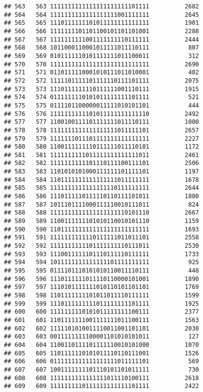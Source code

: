 \documentclass[]{article}
\begin{document}
\begin{verbatim}
## 563   563 1111111111111111111111101111          2682
## 564   564 1111111111111111111001111111          2645
## 565   565 1110111111101011111111111111          1901
## 566   566 1111111101101100101101101001          2288
## 567   567 1111111111001111111110111111          2444
## 568   568 1011000110001011111011110111           807
## 569   569 0101111110101111111011100011           312
## 570   570 1111111111111111111111111111          2690
## 571   571 0110111110001010111011010001           402
## 572   572 1111101111101111110111101111          2075
## 573   573 1110111111110111111001110111          1915
## 574   574 0111111110101011111111101111           521
## 575   575 0111101100000011111010101101           444
## 576   576 1111111111101011111111111110          2492
## 577   577 1100100111101111111011110111          1000
## 578   578 1111111111111111111011111101          2657
## 579   579 1111111011101111111111111111          2227
## 580   580 1100111111110111111011110101          1172
## 581   581 1111111111011111111111111011          2461
## 582   582 1111111111101110111100111101          2506
## 583   583 1101010101000111111101111101          1197
## 584   584 1101111111111111111011111111          1678
## 585   585 1111111111111111110111111111          2644
## 586   586 1110111110111110110111101011          1880
## 587   587 1011101111000111110010111011           824
## 588   588 1111111111111111111110101110          2667
## 589   589 1100111111101010110010101110          1159
## 590   590 1101111111111111111111111111          1693
## 591   591 1111111111110111111011011101          2558
## 592   592 1111111111101111111110111011          2530
## 593   593 1110011111101110111110111111          1733
## 594   594 1011111111111111101111111111           925
## 595   595 0111101110101010110011110111           448
## 596   596 1110111111011110110000101001          1890
## 597   597 1110101111111010110101101101          1769
## 598   598 1101111111101011011110111111          1599
## 599   599 1110111111111011111111101111          1925
## 600   600 1111111110101011111111100111          2377
## 601   601 1101111111001111111011100111          1563
## 602   602 1111101010011110011001101101          2030
## 603   603 0011111111100001101010101011           127
## 604   604 1100110111101111110010101000          1070
## 605   605 1101111110101011110110111001          1526
## 606   606 0111111111111111111011111101           569
## 607   607 1001111111101110101101011111           730
## 608   608 1111111111111111011110100111          2618
## 609   609 1111111110111111111111101111          2422

\end{verbatim}
\end{document}
